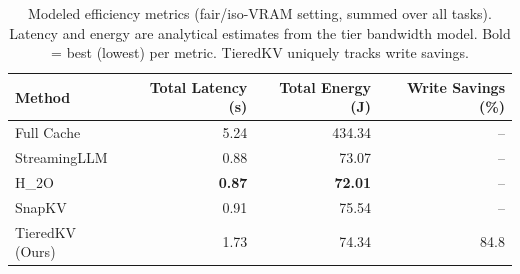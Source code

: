 \begin{table}[t]
\centering
\small
\setlength{\tabcolsep}{4pt}
\caption{Modeled efficiency metrics (fair/iso-VRAM setting, summed over all tasks). Latency and energy are analytical estimates from the tier bandwidth model. Bold = best (lowest) per metric. TieredKV uniquely tracks write savings.}
\label{tab:efficiency}
\begin{tabular}{lrrr}
\toprule
\textbf{Method} & \textbf{Total Latency (s)} & \textbf{Total Energy (J)} & \textbf{Write Savings (\%)} \\
\midrule
Full Cache & 5.24 & 434.34 & -- \\
StreamingLLM & 0.88 & 73.07 & -- \\
H\_2O & \textbf{0.87} & \textbf{72.01} & -- \\
SnapKV & 0.91 & 75.54 & -- \\
TieredKV (Ours) & 1.73 & 74.34 & 84.8 \\
\bottomrule
\end{tabular}
\end{table}
